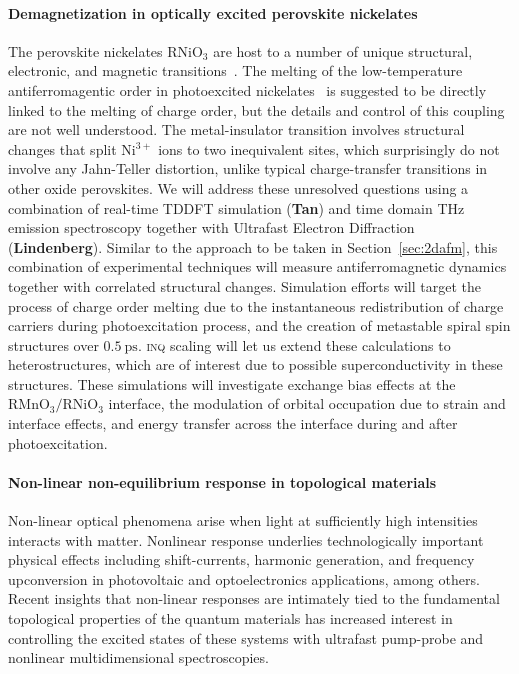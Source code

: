 \paragraph{Demagnetization in optically excited perovskite nickelates}

The perovskite nickelates \(\mathrm{RNiO_3}\) are host to a number of unique structural, electronic, and magnetic transitions~\cite{Giovannetti2009,Hampel2017,Beyerlein2018}.
The melting of the low-temperature antiferromagentic order in photoexcited nickelates~\cite{Caviglia2013} is suggested to be directly linked to the melting of charge order, but the details and control of this coupling are not well understood. 
The metal-insulator transition involves structural changes that split \(\mathrm{Ni^{3+}}\) ions to two inequivalent sites, which surprisingly do not involve any Jahn-Teller distortion, unlike typical charge-transfer transitions in other oxide perovskites. 
We will address these unresolved questions using a combination of real-time TDDFT simulation ({\bf Tan}) and time domain THz emission spectroscopy together with Ultrafast Electron Diffraction ({\bf Lindenberg}). 
Similar to the approach to be taken in Section~\ref{sec:2dafm}, this combination of experimental techniques will measure antiferromagnetic dynamics together with correlated structural changes. 
Simulation efforts will target the process of charge order melting due to the instantaneous redistribution of charge carriers during photoexcitation process, and the creation of metastable spiral spin structures over \(0.5~\mathrm{ps}\). 
\textsc{inq} scaling will let us extend these calculations to heterostructures, which are of interest due to possible superconductivity in these structures. These simulations will investigate exchange bias effects at the \(\mathrm{RMnO_3}/\mathrm{RNiO_3}\) interface, the modulation of orbital occupation due to strain and interface effects, and energy transfer across the interface during and after photoexcitation.

\paragraph{Non-linear non-equilibrium response in topological materials}

Non-linear optical phenomena arise when light at sufficiently high intensities interacts with matter.
Nonlinear response underlies technologically important physical effects including shift-currents, harmonic generation, and frequency upconversion in photovoltaic and optoelectronics applications, among others.
Recent insights that non-linear responses are intimately tied to the fundamental topological properties of the quantum materials has increased interest in controlling the excited states of these systems with ultrafast pump-probe and nonlinear multidimensional spectroscopies.

